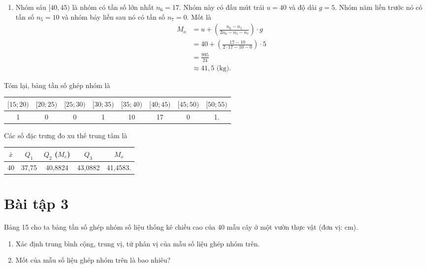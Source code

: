 \documentclass[
  letterpaper,
  DIV=11,
  numbers=noendperiod]{scrartcl}
\providecommand{\tightlist}{%
  \setlength{\itemsep}{0pt}\setlength{\parskip}{0pt}}\usepackage{longtable,booktabs,array}
\begin{document}
\begin{enumerate}
\def\labelenumi{\alph{enumi}.}
\setcounter{enumi}{2}
\tightlist
\item
  Nhóm sáu \([40,45)\) là nhóm có tần số lớn nhất \(n_6=17\). Nhóm này
  có đầu mút trái \(u=40\) và độ dài \(g=5\). Nhóm năm liền trước nó có
  tần số \(n_5=10\) và nhóm bảy liền sau nó có tần số \(n_7=0\). Mốt là
  \begin{align*}
  M_o 
   & = u + \left(\frac{n_6-n_5}{2n_6 - n_5 - n_7}\right)\cdot g \\
   & = 40 + \left(\frac{17-10}{2\cdot 17 - 10 - 0}\right)\cdot 5 \\
   & = \frac{995}{24} \\
   & \approx 41,5 \text{ (kg).}
  \end{align*}
\end{enumerate}

Tóm lại, bảng tần số ghép nhóm là

\begin{center}
\begin{tabular}{|c|c|c|c|c|c|c|c|}
\hline 
$[15;20)$ & $[20; 25)$ & $[25; 30)$ & $[30; 35)$ & $[35;40)$ & $[40; 45)$ & $[45;50)$ & $[50;55)$ \\
\hline 
1 & 0 & 0 & 1 & 10 & 17 & 0 & 1. \\
\hline
\end{tabular}
\end{center}

Các số đặc trưng đo xu thế trung tâm là

\begin{center}
\begin{tabular}{|c|c|c|c|c|}
\hline
$\bar{x}$ & $Q_1$ & $Q_2$ ($M_e$) & $Q_3$ & $M_o$ \\
\hline
40 & 37,75 & 40,8824 & 43,0882 & 41,4583. \\
\hline 
\end{tabular}
\end{center}

\section*{Bài tập 3}

Bảng 15 cho ta bảng tần số ghép nhóm số liệu thống kê chiều cao của 40
mẫu cây ở một vườn thực vật (đơn vị: cm).

\begin{enumerate}
\def\labelenumi{\alph{enumi}.}
\item
  Xác định trung bình cộng, trung vị, tứ phân vị của mẫu số liệu ghép
  nhóm trên.
\item
  Mốt của mẫu số liệu ghép nhóm trên là bao nhiêu?
\end{enumerate}
\end{document}

